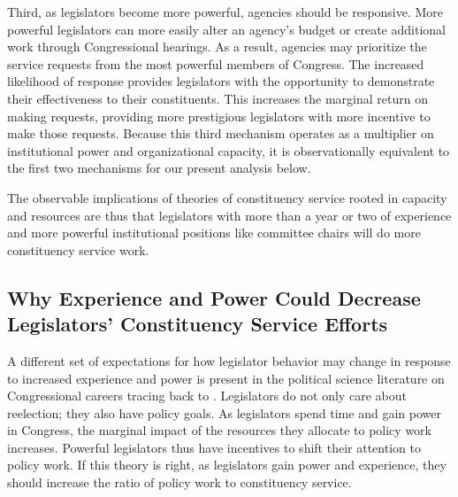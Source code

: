 \documentclass[12pt]{article}
\begin{document}

Third, as legislators become more powerful, agencies should be responsive. More powerful legislators can more easily alter an agency's budget or create additional work through Congressional hearings. As a result, agencies may prioritize the service requests from the most powerful members of Congress. %
The increased likelihood of response provides legislators with the opportunity to demonstrate their effectiveness to their constituents. This increases the marginal return on making requests, providing more prestigious legislators with more incentive to make those requests.  %
Because this third mechanism operates as a multiplier on institutional power and organizational capacity, it is observationally equivalent to the first two mechanisms for our present analysis below.

The observable implications of theories of constituency service rooted in capacity and resources are thus that legislators with more than a year or two of experience and more powerful institutional positions like committee chairs will do more constituency service work.

\subsection{Why Experience and Power Could Decrease Legislators' Constituency Service Efforts}

A different set of expectations for how legislator behavior may change in response to increased experience and power is present in the political science literature on Congressional careers tracing back to \citet{Fenno1973}. Legislators do not only care about reelection; they also have policy goals. As legislators spend time and gain power in Congress, the marginal impact of the resources they allocate to policy work increases. Powerful legislators thus have incentives to shift their attention to policy work. If this theory is right, as legislators gain power and experience, they should increase the ratio of policy work to constituency service.
\end{document}
